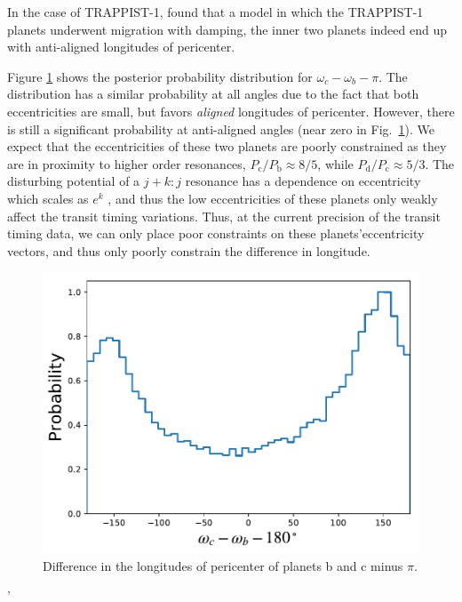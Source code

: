\documentclass[fleqn,usenatbib]{mnras} %
\begin{document}
In the case of TRAPPIST-1, \citet{Papaloizou2017} found that a model
in which the TRAPPIST-1 planets underwent migration with damping, the
inner two planets indeed end up with anti-aligned longitudes of pericenter.

Figure \ref{fig:delta_omega} shows the posterior probability distribution
for $\omega_c-\omega_b-\pi$.   The distribution has a similar probability
at all angles due to the fact that both eccentricities are small, but 
favors {\it aligned} longitudes of pericenter.  However,
there is still a significant probability at anti-aligned angles (near
zero in Fig.\ \ref{fig:delta_omega}).   We expect that the eccentricities
of these two planets are poorly constrained as they are in proximity
to higher order resonances, $P_\mathrm{c}/P_\mathrm{b} {\approx} 8/5$, while $P_\mathrm{d}/P_\mathrm{c} \approx
5/3$.  The disturbing potential of a $j{+}k{:}j$ resonance has a dependence on 
eccentricity which scales as $e^k$ \citep{Deck2016}, and thus the low eccentricities of 
these planets only weakly affect the transit timing variations.  Thus, at 
the current precision of the transit timing data, we can only place poor 
constraints on these planets'eccentricity vectors, and thus only poorly constrain
the difference in longitude.

\begin{figure}
    \centering
    \includegraphics[width=\hsize]{figures/delta_omega_bc.pdf}
    \caption{Difference in the longitudes of pericenter of planets b and
    c minus $\pi$.}
    \label{fig:delta_omega}
\end{figure}'
\end{document}

